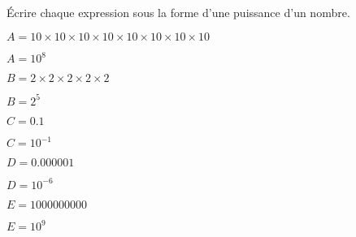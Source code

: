     Écrire chaque expression sous la forme d'une puissance d'un nombre.
    \begin{list}{}{}
        \item[] $A=10\times 10 \times 10\times 10\times 10\times 10\times 10\times 10$

        {\red $A=10^8$}
        \item[] $B=2\times 2\times 2\times 2\times 2$

        {\red $B=2^5$}
        \item[] $C=\num{0.1}$

        {\red $C=10^{-1}$}
        \item[] $D=\num{0.000001}$

        {\red $D=10^{-6}$}
        \item[] $E=\num{1000000000}$

        {\red $E=10^9$}
    \end{list}
